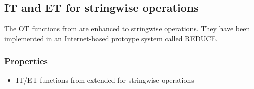 \subsection{IT and ET for stringwise operations}
\label{otf:sun}

The OT functions from \cite{sun98a} are enhanced to stringwise operations. They have been implemented in an Internet-based protoype system called REDUCE.

\subsubsection{Properties}
\begin{itemize}
 \item IT/ET functions from \cite{sun98a} extended for stringwise operations
\end{itemize}

